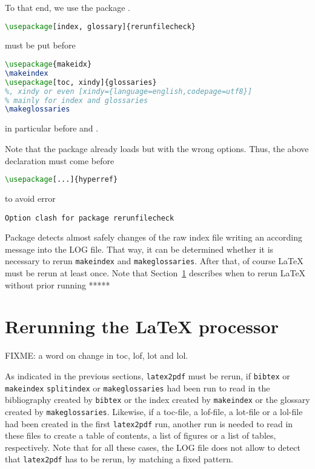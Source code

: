 To that end, we use the package . 
%
\begin{lstlisting}[language=TeX]
\usepackage[index, glossary]{rerunfilecheck}
\end{lstlisting}
%
must be put before 
%
\begin{lstlisting}[language=TeX]
\usepackage{makeidx}
\makeindex
\usepackage[toc, xindy]{glossaries}
%, xindy or even [xindy={language=english,codepage=utf8}]
% mainly for index and glossaries 
\makeglossaries
\end{lstlisting}
%
in particular before  and . 

Note that the package  already loads  
but with the wrong options. 
Thus, the above declaration must come before 
%
\begin{lstlisting}[language=TeX]
\usepackage[...]{hyperref}
\end{lstlisting}
%
to avoid error 
%
\begin{verbatim}
Option clash for package rerunfilecheck
\end{verbatim}

Package  detects almost safely 
changes of the raw index file writing an according message 
into the LOG file. 
That way, it can be determined whether it is necessary 
to rerun \texttt{makeindex} and \texttt{makeglossaries}. 
After that, of course \LaTeX{} must be rerun at least once. 
Note that Section~\ref{sec:rerunLatex} describes 
when to rerun \LaTeX{} without prior running *****

\section{Rerunning the \LaTeX{} processor}\label{sec:rerunLatex}

FIXME\@: a word on change in toc, lof, lot and lol. 

As indicated in the previous sections, 
\texttt{latex2pdf} must be rerun, 
if \texttt{bibtex} or \texttt{makeindex} \texttt{splitindex} 
or \texttt{makeglossaries} 
had been run 
to read in the bibliography created by \texttt{bibtex} 
or the index created by \texttt{makeindex} 
or the glossary created by \texttt{makeglossaries}. 
Likewise, if a toc-file, a lof-file, a lot-file or a lol-file
had been created in the first \texttt{latex2pdf} run, 
another run is needed to read in these files 
to create a table of contents, a list of figures or a list of tables, 
respectively. 
Note that for all these cases, 
the LOG file does not allow to detect that \texttt{latex2pdf} has to be rerun, 
by matching a fixed pattern. 

